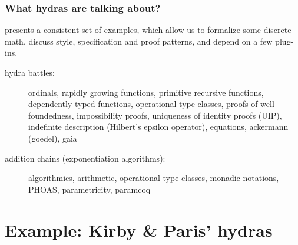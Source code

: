 \documentclass[10pt, fleqn]{beamer}
\begin{document}

\begin{frame}
  \frametitle{What hydras are talking about?}
  \begin{block}{}
    \Hydras presents a consistent set of examples, which allow us to formalize 
    some \textcolor{mathcolor}{discrete math}, discuss
    \textcolor{coqstylecolor}{\coq style, specification and proof patterns}, and depend on \textcolor{plugincolor}{a few plug-ins}.
  \end{block}
  \begin{block}{}
    \begin{description}
    \item[hydra battles:]
      
      \textcolor{mathcolor}{ordinals},
      \textcolor{mathcolor}{rapidly growing functions},
      \textcolor{mathcolor}{primitive recursive functions}, 
      \textcolor{coqstylecolor}{dependently typed functions},
      \textcolor{coqstylecolor}{operational type classes},
      \textcolor{coqstylecolor}{proofs of well-foundedness},
      \textcolor{coqstylecolor}{impossibility proofs},
      \textcolor{coqstylecolor}{uniqueness of identity proofs (UIP)},
      \textcolor{coqstylecolor}{indefinite description (Hilbert's epsilon operator)}, 
      \textcolor{plugincolor}{equations},
      \textcolor{plugincolor}{ackermann (goedel)},
      \textcolor{plugincolor}{gaia}
      
    \item[addition chains (exponentiation algorithms):]
      \textcolor{mathcolor}{algorithmics},
      \textcolor{mathcolor}{arithmetic},
      \textcolor{coqstylecolor}{operational type classes},
      \textcolor{coqstylecolor}{monadic notations},
      \textcolor{coqstylecolor}{PHOAS},
      \textcolor{coqstylecolor}{parametricity}, 
      \textcolor{plugincolor}{paramcoq}
    \end{description}
  \end{block}
\end{frame}


\section{Example: Kirby \& Paris' hydras}
\end{document}

